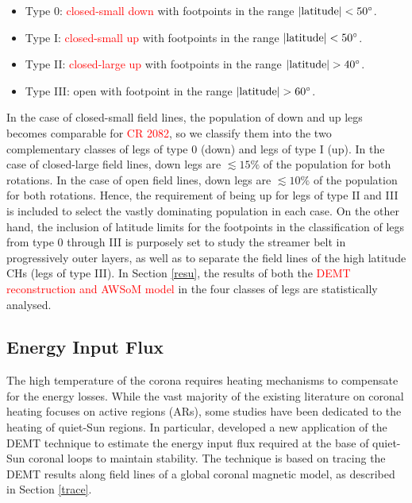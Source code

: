 \documentclass[namedreferences]{solarphysics}
\def\edit#1{\textcolor{Red}{#1}}
\newcommand{\mdeg}{^\circ}
\begin{document}
\begin{article}
\begin{itemize}
\item Type 0: \edit{closed-small down} with footpoints in the range $|{\rm latitude}|<50\mdeg$. 
\item Type I: \edit{closed-small up} with footpoints in the range $|{\rm latitude}|<50\mdeg$. 
\item Type II: \edit{closed-large up} with footpoints in the range $|{\rm latitude}|>40\mdeg$. 
\item Type III: open with footpoint in the range $|{\rm latitude}|>60\mdeg$.
\end{itemize}

{In the case of closed-small field lines, the population of down and up legs becomes comparable for \edit{CR 2082}, so we classify them into the two complementary classes of legs of type 0 (down) and legs of type I (up). In the case of closed-large field lines, down legs are $\lesssim 15\%$ of the population for both rotations. In the case of open field lines, down legs are $\lesssim 10\%$ of the population for both rotations. Hence, the requirement of being up for legs of type II and III is included to select the vastly dominating population in each case. On the other hand, the inclusion of latitude limits for the footpoints in the classification of legs from type 0 through III is purposely set to study the streamer belt in progressively outer layers, as well as to separate the field lines of the high latitude CHs (legs of type III). In Section \ref{resu}, the results of both the \edit{DEMT reconstruction and AWSoM model} in the four classes of legs are statistically analysed.}

\subsection{{Energy Input Flux}}\label{energia} 

{The high temperature of the corona requires heating mechanisms to compensate for the energy losses. While the vast majority of the existing literature on coronal heating focuses on active regions (ARs), some studies have been dedicated to the heating of quiet-Sun regions. In particular, \citet{maccormack_2017} developed a new application of the DEMT technique to estimate the energy input flux required at the base of quiet-Sun coronal loops to maintain stability. The technique is based on tracing the DEMT results along field lines of a global coronal magnetic model, as described in Section \ref{trace}.}


\end{article}
\end{document}

